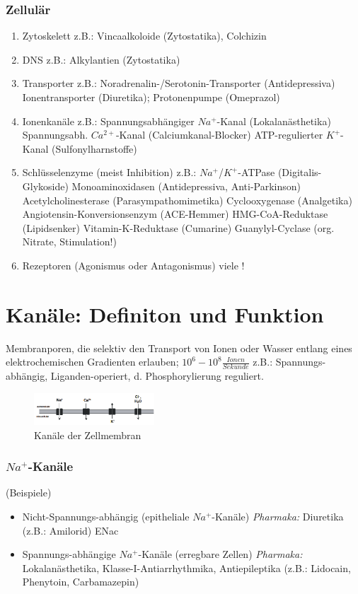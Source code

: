 \documentclass[10pt,a4paper]{report}
\begin{document}
\subsubsection{Zellulär}
\begin{enumerate}
	\item Zytoskelett z.B.: Vincaalkoloide (Zytostatika), Colchizin 
	\item DNS z.B.: Alkylantien (Zytostatika)
	\item Transporter z.B.: 
Noradrenalin-/Serotonin-Transporter (Antidepressiva) Ionentransporter (Diuretika); Protonenpumpe (Omeprazol)
	\item Ionenkanäle z.B.: 
	Spannungsabhängiger $Na^+$-Kanal (Lokalanästhetika)
	Spannungsabh. $Ca^{2+}$-Kanal (Calciumkanal-Blocker)
	ATP-regulierter $K^+$-Kanal (Sulfonylharnstoffe)
	\item Schlüsselenzyme (meist Inhibition) z.B.:
		$Na^+$/$K^+$-ATPase (Digitalis-Glykoside)
		Monoaminoxidasen (Antidepressiva, Anti-Parkinson)
		Acetylcholinesterase (Parasympathomimetika)		
		Cyclooxygenase (Analgetika)
		Angiotensin-Konversionsenzym (ACE-Hemmer)
		HMG-CoA-Reduktase (Lipidsenker)
		Vitamin-K-Reduktase (Cumarine)
		Guanylyl-Cyclase (org. Nitrate, Stimulation!)
	\item Rezeptoren (Agonismus oder Antagonismus)	viele !
\end{enumerate}
\section{Kanäle: Definiton und Funktion}
Membranporen, die selektiv den Transport von Ionen oder Wasser entlang eines elektrochemischen Gradienten erlauben; $10^6-10^8\frac{Ionen}{Sekunde}$
z.B.: Spannungs-abhängig, Liganden-operiert, d. Phosphorylierung reguliert.
\begin{figure}[h]
	\centering 
	\includegraphics[width=0.4\textwidth]{kanaele.png} 
	\caption{Kanäle der Zellmembran} 
	\label{fig:Kanaele}
\end{figure}
\subsubsection{$Na^+$-Kanäle} (Beispiele)\\
\begin{itemize}
	\item Nicht-Spannungs-abhängig (epitheliale $Na^+$-Kanäle) \textit{Pharmaka:}  Diuretika (z.B.: Amilorid) ENac		                           
	\item Spannungs-abhängige $Na^+$-Kanäle (erregbare Zellen)
		\textit{Pharmaka: } Lokalanästhetika, Klasse-I-Antiarrhythmika, Antiepileptika (z.B.: Lidocain, Phenytoin, Carbamazepin)
\end{itemize}
\end{document}
